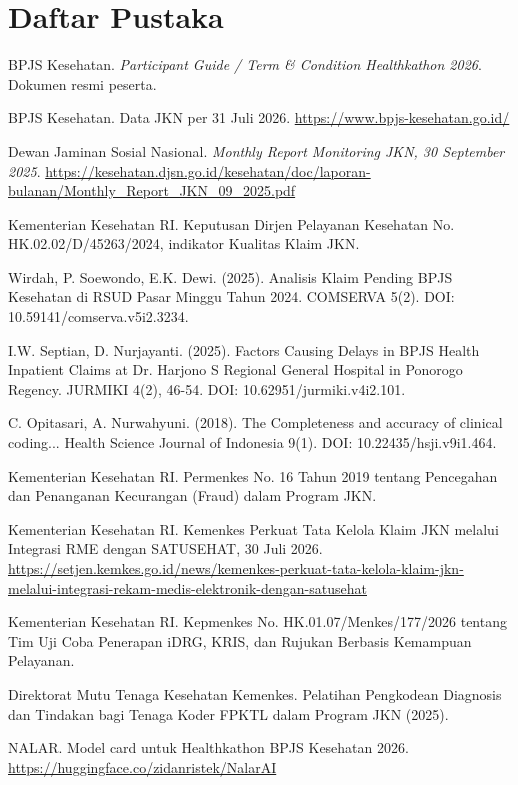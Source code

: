 \documentclass[11pt,a4paper]{article}
\begin{document}
\section*{Daftar Pustaka}
\begin{enumerate}[label={[\arabic*]},leftmargin=*]
\item BPJS Kesehatan. \textit{Participant Guide / Term \& Condition Healthkathon 2026}. Dokumen resmi peserta.
\item BPJS Kesehatan. Data JKN per 31 Juli 2026. \url{https://www.bpjs-kesehatan.go.id/}
\item Dewan Jaminan Sosial Nasional. \textit{Monthly Report Monitoring JKN, 30 September 2025}. \url{https://kesehatan.djsn.go.id/kesehatan/doc/laporan-bulanan/Monthly_Report_JKN_09_2025.pdf}
\item Kementerian Kesehatan RI. Keputusan Dirjen Pelayanan Kesehatan No. HK.02.02/D/45263/2024, indikator Kualitas Klaim JKN.
\item Wirdah, P. Soewondo, E.K. Dewi. (2025). Analisis Klaim Pending BPJS Kesehatan di RSUD Pasar Minggu Tahun 2024. COMSERVA 5(2). DOI: 10.59141/comserva.v5i2.3234.
\item I.W. Septian, D. Nurjayanti. (2025). Factors Causing Delays in BPJS Health Inpatient Claims at Dr. Harjono S Regional General Hospital in Ponorogo Regency. JURMIKI 4(2), 46-54. DOI: 10.62951/jurmiki.v4i2.101.
\item C. Opitasari, A. Nurwahyuni. (2018). The Completeness and accuracy of clinical coding... Health Science Journal of Indonesia 9(1). DOI: 10.22435/hsji.v9i1.464.
\item Kementerian Kesehatan RI. Permenkes No. 16 Tahun 2019 tentang Pencegahan dan Penanganan Kecurangan (Fraud) dalam Program JKN.
\item Kementerian Kesehatan RI. Kemenkes Perkuat Tata Kelola Klaim JKN melalui Integrasi RME dengan SATUSEHAT, 30 Juli 2026. \url{https://setjen.kemkes.go.id/news/kemenkes-perkuat-tata-kelola-klaim-jkn-melalui-integrasi-rekam-medis-elektronik-dengan-satusehat}
\item Kementerian Kesehatan RI. Kepmenkes No. HK.01.07/Menkes/177/2026 tentang Tim Uji Coba Penerapan iDRG, KRIS, dan Rujukan Berbasis Kemampuan Pelayanan.
\item Direktorat Mutu Tenaga Kesehatan Kemenkes. Pelatihan Pengkodean Diagnosis dan Tindakan bagi Tenaga Koder FPKTL dalam Program JKN (2025).
\item NALAR. Model card untuk Healthkathon BPJS Kesehatan 2026. \url{https://huggingface.co/zidanristek/NalarAI}

\end{enumerate}
\end{document}
